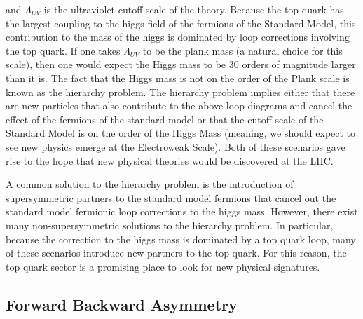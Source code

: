 and $\Lambda_{UV}$ is the ultraviolet cutoff scale of the theory.
Because the top quark has the largest coupling to the higgs field of the fermions of the Standard Model,
this contribution to the mass of the higgs is dominated by loop corrections involving the top quark.
If one takes $\Lambda_{UV}$ to be the plank mass (a natural choice for this scale),
then one would expect the Higgs mass to be 30 orders of magnitude larger than it is.
The fact that the Higgs mass is not on the order of the Plank scale is known as the hierarchy problem.
The hierarchy problem implies either that there are new particles that also contribute to the above loop diagrams
and cancel the effect of the fermions of the standard model
or that the cutoff scale of the Standard Model is on the order of the Higgs Mass (meaning, we should expect to see new physics emerge at the Electroweak Scale).
Both of these scenarios gave rise to the hope that new physical theories would be discovered at the LHC.

A common solution to the hierarchy problem is the introduction of supersymmetric partners to the standard model fermions
that cancel out the standard model fermionic loop corrections to the higgs mass.
However, there exist many non-supersymmetric solutions to the hierarchy problem.
In particular, because the correction to the higgs mass is dominated by a top quark loop, many of these scenarios introduce new partners to the top quark.
For this reason, the top quark sector is a promising place to look for new physical signatures.


\subsection{Forward Backward Asymmetry}

